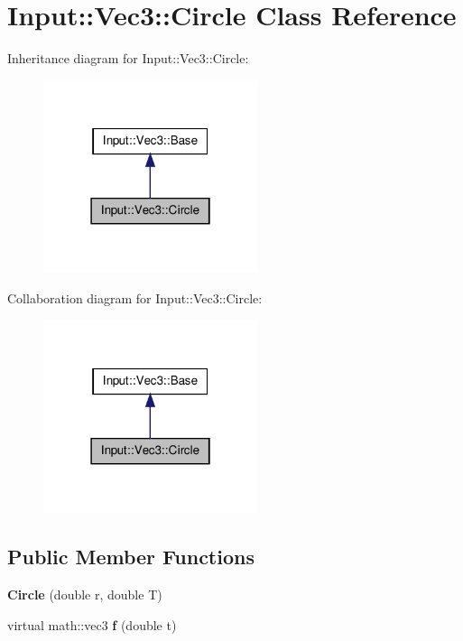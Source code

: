 \hypertarget{classInput_1_1Vec3_1_1Circle}{\section{\-Input\-:\-:\-Vec3\-:\-:\-Circle \-Class \-Reference}
\label{classInput_1_1Vec3_1_1Circle}
}


\-Inheritance diagram for \-Input\-:\-:\-Vec3\-:\-:\-Circle\-:\nopagebreak
\begin{figure}[H]
\begin{center}
\leavevmode
\includegraphics[width=178pt]{classInput_1_1Vec3_1_1Circle__inherit__graph}
\end{center}
\end{figure}


\-Collaboration diagram for \-Input\-:\-:\-Vec3\-:\-:\-Circle\-:\nopagebreak
\begin{figure}[H]
\begin{center}
\leavevmode
\includegraphics[width=178pt]{classInput_1_1Vec3_1_1Circle__coll__graph}
\end{center}
\end{figure}
\subsection*{\-Public \-Member \-Functions}
\begin{DoxyCompactItemize}
\item 
\hypertarget{classInput_1_1Vec3_1_1Circle_a37e8e683d26d784fa1cc05934f660384}{{\bfseries \-Circle} (double r, double \-T)}\label{classInput_1_1Vec3_1_1Circle_a37e8e683d26d784fa1cc05934f660384}

\item 
\hypertarget{classInput_1_1Vec3_1_1Circle_a8a20d13a80afea6b50d200acf9fcf956}{virtual math\-::vec3 {\bfseries f} (double t)}\label{classInput_1_1Vec3_1_1Circle_a8a20d13a80afea6b50d200acf9fcf956}

\end{DoxyCompactItemize}
